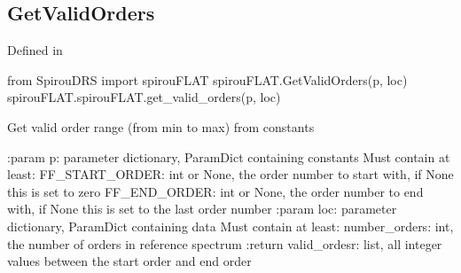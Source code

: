 \noindent\begin{minipage}{\textwidth}
\subsection{GetValidOrders}

Defined in \spirouFLAT{}
\begin{pythonbox}
from SpirouDRS import spirouFLAT
spirouFLAT.GetValidOrders(p, loc)
spirouFLAT.spirouFLAT.get_valid_orders(p, loc)
\end{pythonbox}

\begin{pythondocstring}
Get valid order range (from min to max) from constants

:param p: parameter dictionary, ParamDict containing constants
    Must contain at least:
        FF_START_ORDER: int or None, the order number to start with, if
                         None this is set to zero
        FF_END_ORDER: int or None, the order number to end with, if None
                       this is set to the last order number
:param loc: parameter dictionary, ParamDict containing data
        Must contain at least:
            number_orders: int, the number of orders in reference spectrum
:return valid_ordesr: list, all integer values between the start order and
                      end order
\end{pythondocstring}
\end{minipage}

